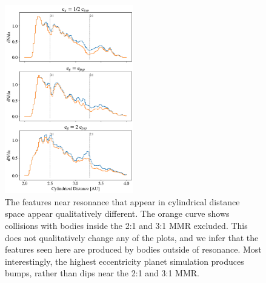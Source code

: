 \documentclass[onecolumn]{aastex63}
\begin{document}
\begin{figure}
\begin{center}
    \includegraphics[width=0.5\textwidth]{figures/coll_hist_r.png}
    \caption{The features near resonance that appear in cylindrical distance space appear qualitatively different.
    The orange curve shows collisions with bodies inside the 2:1 and 3:1 MMR excluded. This does not qualitatively
    change any of the plots, and we infer that the features seen here are produced by bodies outside of resonance.
    Most interestingly,  the highest eccentricity planet simulation produces bumps, rather than dips near the 2:1 and
    3:1 MMR.\label{fig:coll_hist_r}}
\end{center}
\end{figure}
\end{document}
